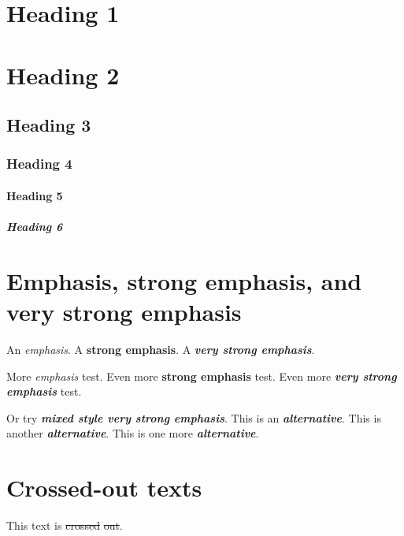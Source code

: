 \label{sect:example}
\chapter*{Heading 1}
\chapter*{Heading 2}
\section*{Heading 3}
\subsection*{Heading 4}
\subsubsection*{Heading 5}
\paragraph*{Heading 6}
\chapter*{Emphasis, strong emphasis, and very strong emphasis}
\par An \emph{emphasis}. A {\bfseries strong emphasis}. A {\bfseries \emph{very strong emphasis}}.
\par More \emph{emphasis} test. Even more {\bfseries strong emphasis} test. Even more {\bfseries \emph{very strong emphasis}} test.
\par Or try {\bfseries \emph{mixed style very strong emphasis}}. This is an \emph{{\bfseries alternative}}. This is another \emph{{\bfseries alternative}}. This is one more {\bfseries \emph{alternative}}.
\chapter*{Crossed-out texts}
\par This text is \sout{c}​\sout{r}​\sout{o}​\sout{s}​\sout{s}​\sout{e}​\sout{d}​\sout{ }​\sout{o}​\sout{u}​\sout{t}.
